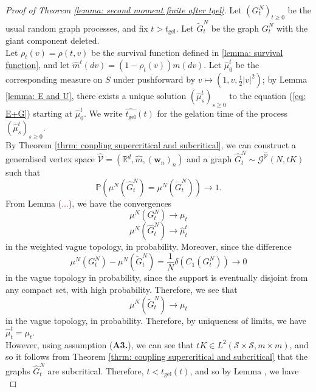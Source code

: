 \begin{proof}[Proof of Theorem \ref{lemma: second moment finite after tgel}] Let $(G^N_t)_{t\geq 0}$ be the usual random graph processes, and fix $t>t_\text{gel}$. Let $\widetilde{G}^N_{t}$ be the graph $G^N_{t}$ with the giant component deleted. \medskip \\ Let $\rho_{t}(v)=\rho(t, v)$ be the survival function defined in \ref{lemma: survival function}, and let $\widehat{m}^t(dv)=(1-\rho_{t}(v))m(dv)$. Let $\widehat{\mu}^t_0$ be the corresponding measure on $S$ under pushforward by $v\mapsto (1, v, \frac{1}{2}|v|^2)$; by Lemma \ref{lemma: E and U}, there exists a unique solution $(\widehat{\mu}^t_s)_{s\geq 0}$ to the equation (\ref{eq: E+G}) starting at $\widehat{\mu}^t_0$. We write $\widehat{t_\text{gel}}(t)$ for the gelation time of the process $(\widehat{\mu}^t_s)_{s\geq 0}$. \medskip \\ By Theorem \ref{thrm: coupling supercritical and subcritical}, we can construct a generalised vertex space $\widehat{\mathcal{V}}=(\mathbb{R}^d, \widehat{m}, (\mathbf{w}_n)_n)$ and a graph $\widehat{G}^N_{t}\sim \mathcal{G}^{\widehat{\mathcal{V}}}(N,tK)$ such that 
\begin{equation}
    \mathbb{P}\left(\mu^N(\widehat{G}^N_{t})=\mu^N(\widetilde{G}^N_{t})\right)\rightarrow 1.
\end{equation} From Lemma (\textcolor{red}{...}), we have the convergences 
\begin{equation}
    \mu^N(G^N_{t})\rightarrow {\mu}_{t}
\end{equation}
\begin{equation}
    \mu^N(\widehat{G}^N_{t})\rightarrow \widehat{\mu}^t_{t}
\end{equation} in the weighted vague topology, in probability.  Moreover, since the difference \begin{equation}
    \mu^N(G^N_{t})-\mu^N(\widetilde{G}^N_{t})=\frac{1}{N}\delta(C_1(G^N_{t})) \rightarrow 0
\end{equation} in the vague topology in probability, since the support is eventually disjoint from any compact set, with high probability.  Therefore, we see that \begin{equation}
    \mu^N(\widetilde{G}^N_{t})\rightarrow \mu_{t}
\end{equation} in the vague topology, in probability. Therefore, by uniqueness of limits, we have $\widehat{\mu}^t_{t}=\mu_{t}$.\medskip \\ However, using assumption (\textbf{A3.}), we can see that $t K\in L^2(\mathcal{S}\times\mathcal{S}, m\times m)$, and so it follows from Theorem \ref{thrm: coupling supercritical and subcritical} that the graphs $\widehat{G}^N_{t}$ are subcritical. Therefore, $t<\widehat{t_\text{gel}}(t)$, and so by Lemma , we have \begin{equation}

\end{equation}
\end{proof}
